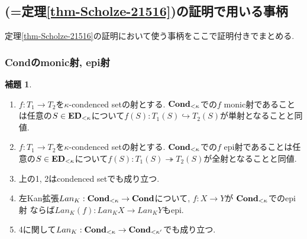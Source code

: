 \documentclass[dvipdfmx,a4paper,11pt]{report}
\theoremstyle{definition}
\newtheorem{lem}[thm]{補題}
\begin{document}
\subsection{\cite[Proposition 2.15, Theorem 2.16]{Sch19}(=定理\ref{thm-Scholze-21516})の証明で用いる事柄}
定理\ref{thm-Scholze-21516}の証明において使う事柄をここで証明付きでまとめる. 

 \subsubsection{{\bf Cond}のmonic射, epi射}

 
 \begin{tcolorbox}
 [colback = white, colframe = green!35!black, fonttitle = \bfseries,breakable = true]
 \begin{lem}\cite[Theorem 4.11.2, 4.11.3, 4.11.4]{Bar22}
 \label{lem-cond-epi}
 \text{}
 \begin{enumerate}
 \item $f : T_1 \to T_2$を$\kappa$-condenced setの射とする. ${\bf Cond}_{<\kappa}$での$f$ monic射であることは任意の$S \in {\bf ED}_{<\kappa}$について$f(S) : T_1(S) \hookrightarrow T_2(S)$が単射となることと同値.
  \item $f : T_1 \to T_2$を$\kappa$-condenced setの射とする.
   ${\bf Cond}_{<\kappa}$での$f$ epi射であることは任意の$S \in {\bf ED}_{<\kappa}$について$f(S) : T_1(S) \twoheadrightarrow T_2(S)$が全射となることと同値.
  \item 上の1, 2はcondenced setでも成り立つ. 
  \item 左Kan拡張$Lan_{K} : {\bf Cond}_{<\kappa} \to {\bf Cond}$について, $f : X \to Y$が
${\bf Cond}_{<\kappa}$でのepi射
  ならば$Lan_{K}(f) : Lan_{K}X \to Lan_{K}Y$もepi.
  \item 4に関して$Lan_{K} : {\bf Cond}_{<\kappa} \to {\bf Cond}_{< \kappa'}$でも成り立つ. 
 \end{enumerate}
 \end{lem}
 \end{tcolorbox}
\end{document}

